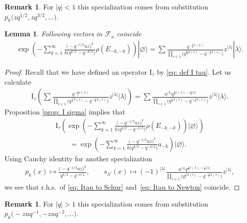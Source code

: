 \documentclass[pdftex]{sigma}
\numberwithin{equation}{section}
\newtheorem{Lemma}[Theorem]{Lemma}
\theoremstyle{definition}
\newtheorem{Remark}[Theorem]{Remark}
\newcommand{\I}{\mathrm{I}}
\begin{document}
\begin{Remark} For $|q| < 1$ this specialization comes from substitution $p_k\big(zq^{1/2},zq^{3/2},\dots\big)$.
\end{Remark}

\begin{Lemma} \label{lemma: Whittaker Cond 2}
Following vectors in $\mathcal{F}_u$ coincide
\begin{gather*}%
\exp\left(-\sum_{k=1}^\infty \frac{\big({-}q^{-1/2}uz \big)^{k}}{k\big(q^{k/2}-q^{-k/2}\big)}\rho(E_{-k,-k})\right)|\varnothing\rangle = \sum \frac{q^{-\frac12c(\lambda)} }{\prod\limits_{s\in\lambda}\big(q^{\frac12h(s)}-q^{-\frac12h(s)}\big)} z^{| \lambda |} |\lambda\rangle.
\end{gather*}
\end{Lemma}
\begin{proof}
Recall that we have defined an operator $\I_{\tau}$ by \eqref{eq: def I tau}. Let us calculate
\begin{gather} \label{eq: Itau to Schur}
\I_{\tau} \left( \sum \frac{q^{-\frac12 c(\lambda)} }{\prod\limits_{s\in\lambda}\big(q^{\frac12h(s)}-q^{-\frac12h(s)}\big)} z^{| \lambda |} |\lambda\rangle \right) = \sum \frac{u^{| \lambda |} q^{\frac12 c(\lambda) - \frac12 | \lambda|} }{\prod\limits_{s\in\lambda}\big(q^{\frac12h(s)}-q^{-\frac12h(s)}\big)} z^{| \lambda |} |\lambda\rangle.
\end{gather}
Proposition \ref{prop: I sigma} implies that
\begin{gather}
\I_{\tau} \left(\exp\left(-\sum_{k=1}^\infty \frac{\big({-}q^{-1/2}uz \big)^{k}}{k\big(q^{k/2}-q^{-k/2}\big)}\rho(E_{-k,-k})\right)|\varnothing\rangle \right) \nonumber\\
\qquad{} = \exp\left(-\sum_{k=1}^\infty \frac{\big({-}q^{-1/2}uz \big)^{k}}{k\big(q^{k/2}-q^{-k/2}\big)} a_{-k}\right)|\varnothing\rangle.\label{eq: Itau to Newton}
\end{gather}
Using Cauchy identity for another specialization
\begin{gather*}
p_k(x) \mapsto \frac{\big({-}q^{-1/2}u z \big)^k}{q^{k/2}-q^{-k/2}},\qquad s_{\lambda'}(x) \mapsto (-1)^{|\lambda|} \frac{u^{|\lambda|}q^{\frac12 c(\lambda) - \frac12|\lambda| }}{\prod\limits_{s\in\lambda}\big(q^{\frac12h(s)}-q^{-\frac12h(s)}\big)} z^{|\lambda|},
\end{gather*}
we see that r.h.s.\ of \eqref{eq: Itau to Schur} and~\eqref{eq: Itau to Newton} coincide.
\end{proof}

\begin{Remark} For $|q| > 1$ this specialization comes from substitution $p_k\big({-}zuq^{-1},-zuq^{-2},\dots\big)$.
\end{Remark}
\end{document}
